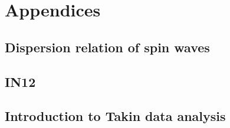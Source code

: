 \appendix
\section*{Appendices}
\renewcommand{\thesubsection}{\Alph{subsection}}
\subsection{Dispersion relation of spin waves}\label{Dispersion_relation}










\newpage
\subsection{IN12}\label{IN12}







\newpage
\subsection{Introduction to Takin data analysis}\label{takin}










